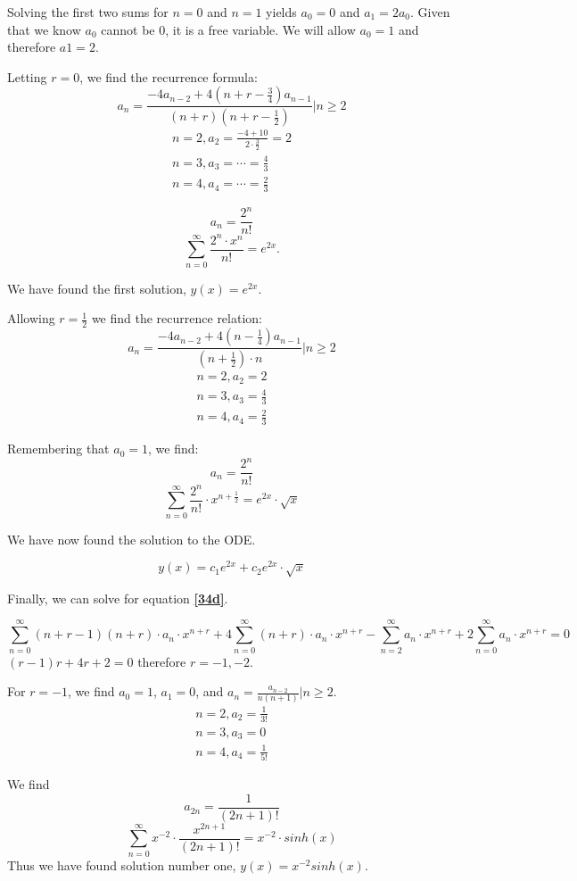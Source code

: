 \documentclass{article}
\begin{document}
Solving the first two sums for $n=0$ and $n=1$ yields $a_0=0$ and $a_1=2a_0$. Given that we know $a_0$ cannot be 0, it is a free variable. We will allow $a_0 = 1$ and therefore $a1 = 2$.

Letting $r = 0$, we find the recurrence formula:
$$a_n = \frac{-4a_{n-2}+4(n+r-\frac{3}{4})a_{n-1}}{(n+r)(n+r-\frac{1}{2})} \Bigr| n \geq 2$$
\begin{align*}
n=2, a_2 = \frac{ -4 + 10}{2 \cdot \frac{3}{2}} = 2\\
n=3, a_3 = \cdots = \frac{4}{3}\\
n=4, a_4 = \cdots = \frac{2}{3}
\end{align*}

$$a_n = \frac{2^n}{n!}$$
$$\sum_{n=0}^{\infty} \frac{2^n \cdot x^n}{n!} = e^{2x}.$$

We have found the first solution, $y(x) = e^{2x}$.

Allowing $r=\frac{1}{2}$ we find the recurrence relation:
$$a_n = \frac{-4a_{n-2} + 4(n-\frac{1}{4})a_{n-1}}{(n+\frac{1}{2}) \cdot n} \Bigr| n \geq 2$$
\begin{align*}
n=2, a_2 = 2\\
n=3, a_3 = \frac{4}{3}\\
n=4, a_4 = \frac{2}{3}
\end{align*}

Remembering that $a_0 = 1$, we find:
$$a_n = \frac{2^n}{n!}$$
$$\sum_{n=0}^{\infty} \frac{2^n}{n!} \cdot x^{n+\frac{1}{2}} = e^{2x} \cdot \sqrt{x}$$

We have now found the solution to the ODE.

\[
y(x) = c_1 e^{2x} + c_2 e^{2x} \cdot \sqrt{x}
\]

\par
Finally, we can solve for equation \textbf{\eqref{34d}}.

\[
\sum_{n=0}^{\infty} (n+r-1)(n+r) \cdot a_n \cdot x^{n+r} + 4\sum_{n=0}^{\infty} (n+r) \cdot a_n \cdot x^{n+r} - \sum_{n=2}^{\infty} a_n \cdot x^{n+r} + 2 \sum_{n=0}^{\infty} a_n \cdot x^{n+r} = 0
\]
$(r-1)r+4r+2=0$ therefore $r = -1, -2$.

For $r = -1$, we find $a_0 = 1$, $a_1 = 0$, and $a_n = \frac{a_{n-2}}{n(n+1)} \Bigr | n \geq 2$.
\begin{align*}
n=2, a_2 = \frac{1}{3!}\\
n=3, a_3 = 0\\
n=4, a_4 = \frac{1}{5!}
\end{align*}

We find
$$a_{2n} = \frac{1}{(2n+1)!}$$
$$\sum_{n=0}^{\infty} x^{-2} \cdot \frac{x^{2n+1}}{(2n+1)!} = x^{-2} \cdot sinh(x) $$
Thus we have found solution number one, $y(x) = x^{-2} sinh(x)$.
\end{document}
